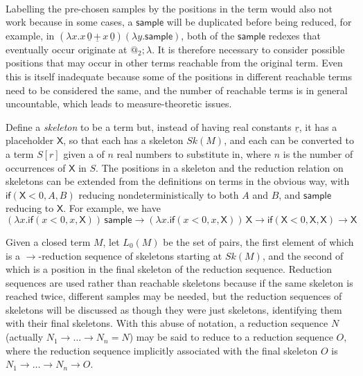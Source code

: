 \documentclass{article}
\newcommand{\tif}[3]{\mathsf{if}(#1, #2, #3)} %
\newcommand{\tsample}{\mathsf{sample}}
\newcommand{\skeletonPlaceholder}{\mathsf{X}} %
\theoremstyle{definition}
\theoremstyle{lemma}
\theoremstyle{remark}
\begin{document}
\paragraph{}
Labelling the pre-chosen samples by the positions in the term would also not work because in some cases, a $\tsample$ will be duplicated before being reduced, for example, in $(\lambda x. x \, {\underline 0} \, \mathbin{\underline{+}} \, {x \, \underline 0}) (\lambda y. \tsample)$, both of the $\tsample$ redexes that eventually occur originate at $@_2 ; \lambda$. 
It is therefore necessary to consider possible positions that may occur in other terms reachable from the original term. 
Even this is itself inadequate because some of the positions in different reachable terms need to be considered the same, and the number of reachable terms is in general uncountable, which leads to measure-theoretic issues.

Define a \emph{skeleton} to be a term but, instead of having real constants $\underline r$, it has a placeholder $\skeletonPlaceholder$, so that each  has a skeleton $Sk(M)$, and each  can be converted to a term $S[r]$ given a  of $n$ real numbers to substitute in, where $n$ is the number of occurrences of $\skeletonPlaceholder$ in $S$. 
The positions in a skeleton and the reduction relation on skeletons can be extended from the definitions on terms in the obvious way, with $\tif{\skeletonPlaceholder < 0}{A}{B}$ reducing nondeterministically to both $A$ and $B$, and $\tsample$ reducing to $\skeletonPlaceholder$.
For example, we have 
\(
(\lambda x . \tif{x < 0}{x}{\skeletonPlaceholder}) \, \tsample
\to
(\lambda x . \tif{x < 0}{x}{\skeletonPlaceholder}) \, \skeletonPlaceholder
\to
\tif{\skeletonPlaceholder < 0}{\skeletonPlaceholder}{\skeletonPlaceholder}
\to
\skeletonPlaceholder
\)

Given a closed term $M$, let $L_0(M)$ be the set of pairs, the first element of which is a $\to$-reduction sequence of skeletons starting at $Sk(M)$, and the second of which is a position in the final skeleton of the reduction sequence. 
Reduction sequences are used rather than reachable skeletons because if the same skeleton is reached twice, different samples may be needed,  but the reduction sequences of skeletons will be discussed as though they were just skeletons, identifying them with their final skeletons. With this abuse of notation, a reduction sequence $N$ (actually $N_1 \to \dots \to N_n = N$) may be said to reduce to a reduction sequence $O$, where the reduction sequence implicitly associated with the final skeleton $O$ is $N_1 \to \dots \to N_n \to O$.
\end{document}
